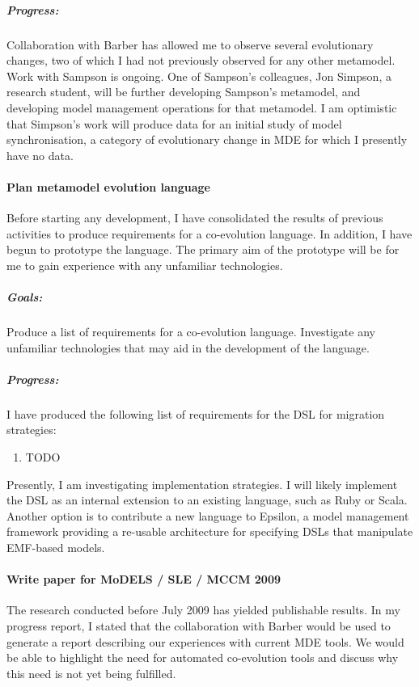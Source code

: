 \subparagraph{Progress:} Collaboration with Barber has allowed me to observe several evolutionary changes, two of which I had not previously observed for any other metamodel. Work with Sampson is ongoing. One of Sampson's colleagues, Jon Simpson, a research student, will be further developing Sampson's metamodel, and developing model management operations for that metamodel. I am optimistic that Simpson's work will produce data for an initial study of model synchronisation, a category of evolutionary change in MDE for which I presently have no data.



\paragraph{Plan metamodel evolution language} %
\label{par:plan_metamodel_evolution_language}
Before starting any development, I have consolidated the results of previous activities to produce requirements for a co-evolution language. In addition, I have begun to prototype the language. The primary aim of the prototype will be for me to gain experience with any unfamiliar technologies.

\subparagraph{Goals:} Produce a list of requirements for a co-evolution language. Investigate any unfamiliar technologies that may aid in the development of the language.

\subparagraph{Progress:} I have produced the following list of requirements for the DSL for migration strategies:

\begin{enumerate}
	\item TODO
\end{enumerate}

Presently, I am investigating implementation strategies. I will likely implement the DSL as an internal extension to an existing language, such as Ruby or Scala. Another option is to contribute a new language to Epsilon, a model management framework providing a re-usable architecture for specifying DSLs that manipulate EMF-based models.


\paragraph{Write paper for MoDELS / SLE / MCCM 2009} %
\label{par:write_paper_for_models_sle_mccm_2009}
The research conducted before July 2009 has yielded publishable results. In my progress report, I stated that the collaboration with Barber would be used to generate a report describing our experiences with current MDE tools. We would be able to highlight the need for automated co-evolution tools and discuss why this need is not yet being fulfilled.


